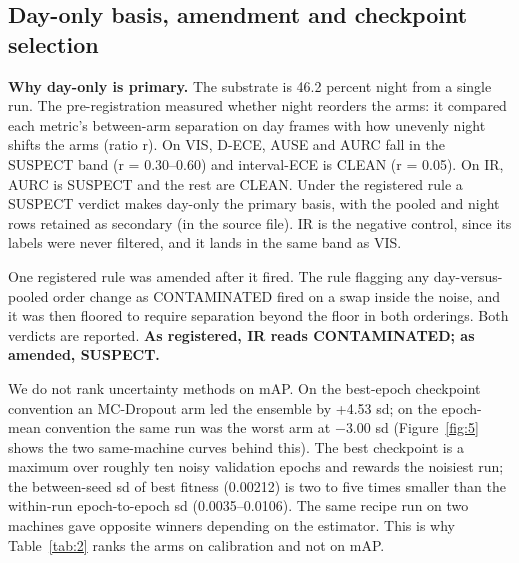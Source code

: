 \documentclass[10pt]{article}
\begin{document}
\subsection{Day-only basis, amendment and checkpoint selection}\label{app:F.4}
\textbf{Why day-only is primary.} The substrate is 46.2 percent night from a single run. The pre-registration measured whether night reorders the arms: it compared each metric's between-arm separation on day frames with how unevenly night shifts the arms (ratio r). On VIS, D-ECE, AUSE and AURC fall in the SUSPECT band (r = 0.30--0.60) and interval-ECE is CLEAN (r = 0.05). On IR, AURC is SUSPECT and the rest are CLEAN. Under the registered rule a SUSPECT verdict makes day-only the primary basis, with the pooled and night rows retained as secondary (in the source file). IR is the negative control, since its labels were never filtered, and it lands in the same band as VIS.

One registered rule was amended after it fired. The rule flagging any day-versus-pooled order change as CONTAMINATED fired on a swap inside the noise, and it was then floored to require separation beyond the floor in both orderings. Both verdicts are reported. \textbf{As registered, IR reads CONTAMINATED; as amended, SUSPECT.}

We do not rank uncertainty methods on mAP. On the best-epoch checkpoint convention an MC-Dropout arm led the ensemble by +4.53 sd; on the epoch-mean convention the same run was the worst arm at $-$3.00 sd (Figure~\ref{fig:5} shows the two same-machine curves behind this). The best checkpoint is a maximum over roughly ten noisy validation epochs and rewards the noisiest run; the between-seed sd of best fitness (0.00212) is two to five times smaller than the within-run epoch-to-epoch sd (0.0035--0.0106). The same recipe run on two machines gave opposite winners depending on the estimator. This is why Table~\ref{tab:2} ranks the arms on calibration and not on mAP.
\end{document}
